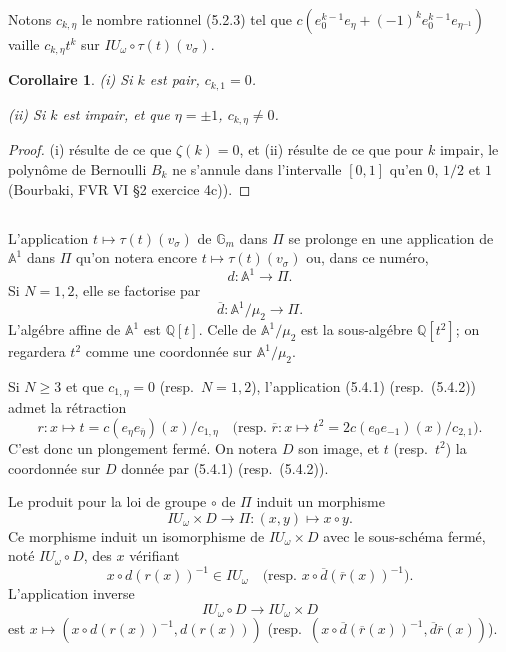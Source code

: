 \documentclass[11pt,a4paper]{article}
\theoremstyle{plain}
\newtheorem{corollary}[theorem]{Corollaire}
\theoremstyle{definition}
\newcommand{\Gm}{\mathbb{G}_m}
\newcommand{\Q}{\mathbb{Q}}
\newcommand{\A}{\mathbb{A}}
\begin{document}
Notons $c_{k,\eta}$ le nombre rationnel (5.2.3) tel que $c(e_0^{k-1}e_\eta + (-1)^k e_0^{k-1}e_{\eta^{-1}})$ vaille $c_{k,\eta} t^k$ sur $IU_\omega \circ \tau(t)(v_\sigma)$.

\begin{corollary}\label{cor:5.3}
\emph{(i)} Si $k$ est pair, $c_{k,1} = 0$.

\emph{(ii)} Si $k$ est impair, et que $\eta = \pm 1$, $c_{k,\eta} \neq 0$.
\end{corollary}

\begin{proof}
(i) r\'esulte de ce que $\zeta(k) = 0$, et (ii) r\'esulte de ce que pour $k$ impair, le polyn\^ome de Bernoulli $B_k$ ne s'annule dans l'intervalle $[0,1]$ qu'en $0$, $1/2$ et $1$ (Bourbaki, FVR VI \S 2 exercice 4c)).
\end{proof}

\subsection{}
L'application $t \mapsto \tau(t)(v_\sigma)$ de $\Gm$ dans $\Pi$ se prolonge en une application de $\A^1$ dans $\Pi$ qu'on notera encore $t \mapsto \tau(t)(v_\sigma)$ ou, dans ce num\'ero,
\begin{equation}\label{eq:5.4.1}
d: \A^1 \to \Pi.
\end{equation}
Si $N=1,2$, elle se factorise par
\begin{equation}\label{eq:5.4.2}
\overline{d}: \A^1/\mu_2 \to \Pi.
\end{equation}
L'alg\'ebre affine de $\A^1$ est $\Q[t]$. Celle de $\A^1/\mu_2$ est la sous-alg\'ebre $\Q[t^2]$; on regardera $t^2$ comme une coordonn\'ee sur $\A^1/\mu_2$.

Si $N \geq 3$ et que $c_{1,\eta} = 0$ (resp.~$N=1,2$), l'application (5.4.1) (resp.~(5.4.2)) admet la r\'etraction
\begin{equation}\label{eq:5.4.3}
r: x \mapsto t = c(e_\eta e_{\overline{\eta}})(x)/c_{1,\eta} \quad \text{(resp. } \overline{r}: x \mapsto t^2 = 2c(e_0 e_{-1})(x)/c_{2,1} \text{)}.
\end{equation}
C'est donc un plongement ferm\'e. On notera $D$ son image, et $t$ (resp.~$t^2$) la coordonn\'ee sur $D$ donn\'ee par (5.4.1) (resp.~(5.4.2)).

Le produit pour la loi de groupe $\circ$ de $\Pi$ induit un morphisme
\begin{equation}\label{eq:5.4.4}
IU_\omega \times D \to \Pi: (x,y) \mapsto x \circ y.
\end{equation}
Ce morphisme induit un isomorphisme de $IU_\omega \times D$ avec le sous-sch\'ema ferm\'e, not\'e $IU_\omega \circ D$, des $x$ v\'erifiant
\begin{equation}\label{eq:5.4.5}
x \circ d(r(x))^{-1} \in IU_\omega \quad \text{(resp. } x \circ \overline{d}(\overline{r}(x))^{-1} \text{)}.
\end{equation}
L'application inverse
\begin{equation}\label{eq:5.4.6}
IU_\omega \circ D \to IU_\omega \times D
\end{equation}
est $x \mapsto (x \circ d(r(x))^{-1}, d(r(x)))$ (resp.~$(x \circ \overline{d}(\overline{r}(x))^{-1}, \overline{d}\overline{r}(x))$).
\end{document}
